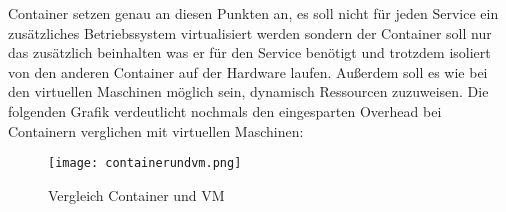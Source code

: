Container setzen genau an diesen Punkten an, es soll nicht für jeden Service ein zusätzliches Betriebssystem virtualisiert werden sondern der Container soll nur das zusätzlich beinhalten was er für den Service benötigt und trotzdem isoliert von den anderen Container auf der Hardware laufen. Außerdem soll es wie bei den virtuellen Maschinen möglich sein, dynamisch Ressourcen zuzuweisen.\cite{12005068320161201,redhat} Die folgenden Grafik verdeutlicht nochmals den eingesparten Overhead bei Containern verglichen mit virtuellen Maschinen: 
\begin{figure}[H]
	\begin{center}
		\texttt{[image: containerundvm.png]}
	\end{center}
	\caption[Vergleich Container und VM]{Vergleich Container und VM \footnotemark}
	\label{fig:VergleichContainerVM}
\end{figure}

